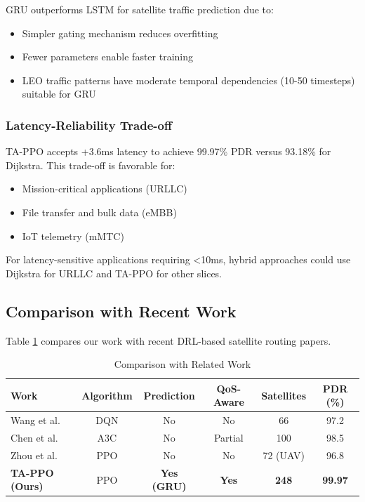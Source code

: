 GRU outperforms LSTM for satellite traffic prediction due to:
\begin{itemize}
\item Simpler gating mechanism reduces overfitting
\item Fewer parameters enable faster training
\item LEO traffic patterns have moderate temporal dependencies (10-50 timesteps) suitable for GRU
\end{itemize}

\subsubsection{Latency-Reliability Trade-off}

TA-PPO accepts +3.6ms latency to achieve 99.97\% PDR versus 93.18\% for Dijkstra. This trade-off is favorable for:
\begin{itemize}
\item Mission-critical applications (URLLC)
\item File transfer and bulk data (eMBB)
\item IoT telemetry (mMTC)
\end{itemize}

For latency-sensitive applications requiring <10ms, hybrid approaches could use Dijkstra for URLLC and TA-PPO for other slices.

\subsection{Comparison with Recent Work}

Table \ref{tab:related_comparison} compares our work with recent DRL-based satellite routing papers.

\begin{table}[t]
\centering
\caption{Comparison with Related Work}
\label{tab:related_comparison}
\begin{tabular}{|l|c|c|c|c|c|}
\hline
\textbf{Work} & \textbf{Algorithm} & \textbf{Prediction} & \textbf{QoS-Aware} & \textbf{Satellites} & \textbf{PDR (\%)} \\
\hline
\hline
Wang et al. \cite{wang2021intelligent} & DQN & No & No & 66 & 97.2 \\
Chen et al. \cite{chen2021deep} & A3C & No & Partial & 100 & 98.5 \\
Zhou et al. \cite{zhou2021intelligent} & PPO & No & No & 72 (UAV) & 96.8 \\
\textbf{TA-PPO (Ours)} & PPO & \textbf{Yes (GRU)} & \textbf{Yes} & \textbf{248} & \textbf{99.97} \\
\hline
\end{tabular}
\end{table}

